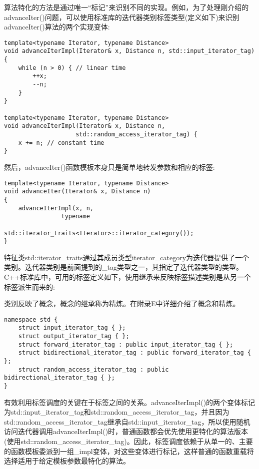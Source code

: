 
算法特化的方法是通过唯一“标记”来识别不同的实现。例如，为了处理刚介绍的advanceIter()问题，可以使用标准库的迭代器类别标签类型(定义如下)来识别advanceIter()算法的两个实现变体:

\begin{lstlisting}[style=styleCXX]
template<typename Iterator, typename Distance>
void advanceIterImpl(Iterator& x, Distance n, std::input_iterator_tag)
{
	while (n > 0) { // linear time
		++x;
		--n;
	}
}

template<typename Iterator, typename Distance>
void advanceIterImpl(Iterator& x, Distance n,
					std::random_access_iterator_tag) {
	x += n; // constant time
}
\end{lstlisting}

然后，advanceIter()函数模板本身只是简单地转发参数和相应的标签:

\begin{lstlisting}[style=styleCXX]
template<typename Iterator, typename Distance>
void advanceIter(Iterator& x, Distance n)
{
	advanceIterImpl(x, n,
				typename
						std::iterator_traits<Iterator>::iterator_category());
}
\end{lstlisting}

特征类std::iterator\_traits通过其成员类型iterator\_category为迭代器提供了一个类别。迭代器类别是前面提到的\_tag类型之一，其指定了迭代器类型的类型。C++标准库中，可用的标签定义如下，使用继承来反映标签描述类别是从另一个标签派生而来的:

\begin{tcolorbox}[colback=webgreen!5!white,colframe=webgreen!75!black]
\hspace*{0.75cm}类别反映了概念，概念的继承称为精炼。在附录E中详细介绍了概念和精炼。
\end{tcolorbox}

\begin{lstlisting}[style=styleCXX]
namespace std {
	struct input_iterator_tag { };
	struct output_iterator_tag { };
	struct forward_iterator_tag : public input_iterator_tag { };
	struct bidirectional_iterator_tag : public forward_iterator_tag { };
	struct random_access_iterator_tag : public bidirectional_iterator_tag { };
}
\end{lstlisting}

有效利用标签调度的关键在于标签之间的关系。advanceIterImpl()的两个变体标记为std::input\_iterator\_tag和std::random\_access\_iterator\_tag，并且因为std::random\_access\_iterator\_tag继承自std::input\_iterator\_tag，所以使用随机访问迭代器调用advanceIterImpl()时，普通函数都会优先使用更特化的算法版本(使用std::random\_access\_iterator\_tag)。因此，标签调度依赖于从单一的、主要的函数模板委派到一组\_impl变体，对这些变体进行标记，这样普通的函数重载将选择适用于给定模板参数最特化的算法。

